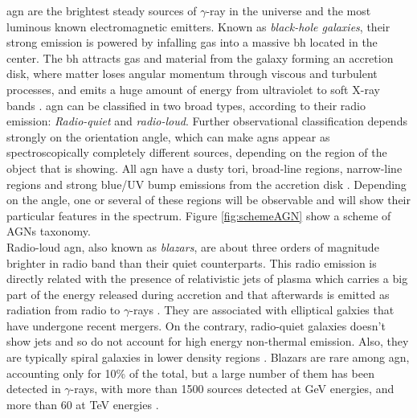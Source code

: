 \documentclass[main.tex]{subfiles}
\begin{document}
\gls{agn} are the brightest steady sources of $\gamma$-ray in the universe and the most luminous known electromagnetic emitters. Known as \textit{black-hole galaxies}, their strong emission is powered by infalling gas into a massive \gls{bh} located in the center. The \gls{bh} attracts gas and material from the galaxy forming an accretion disk, where matter loses angular momentum through viscous and turbulent processes, and emits a huge amount of energy from ultraviolet to soft X-ray bands \cite{1995AGN}. \gls{agn} can be classified in two broad types, according to their radio emission: \textit{Radio-quiet} and \textit{radio-loud}. Further observational classification depends strongly on the orientation angle, which can make \glspl{agn} appear as spectroscopically completely different sources, depending on the region of the object that is showing. All \gls{agn} have a dusty tori, broad-line regions, narrow-line regions and strong blue/UV bump emissions from the accretion disk \cite{2016AGNsingammarays}. Depending on the angle, one or several of these regions will be observable and will show their particular features in the spectrum. Figure \ref{fig:schemeAGN} show a scheme of AGNs taxonomy.\\
Radio-loud \gls{agn}, also known as \textit{blazars}, are about three orders of magnitude brighter in radio band than their quiet counterparts. This radio emission is directly related with the presence of relativistic jets of plasma which carries a big part of the energy released during accretion and that afterwards is emitted as radiation from radio to $\gamma$-rays \cite{2016AGNgammarayobss}. They are associated with elliptical galxies that have undergone recent mergers.
On the contrary, radio-quiet galaxies doesn't show jets and so do not account for high energy non-thermal emission. Also, they are typically spiral galaxies in lower density regions \cite{1995AGNradioloudradioquiet}.
Blazars are rare among \gls{agn}, accounting only for 10\% of the total, but a large number of them has been detected in $\gamma$-rays, with more than 1500 sources detected at GeV energies, and more than 60 at TeV energies \cite{2016AGNsingammarays}.
\end{document}
